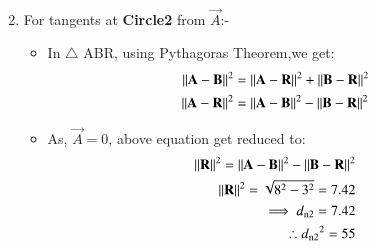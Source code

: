 \documentclass[journal,12pt,twocolumn]{IEEEtran}
\begin{document}
\begin{enumerate}
\begin{align}
\end{align}
\item For tangents at \textbf{Circle2} from $\vec{A}$:-
\begin{itemize}
\item In $\triangle$ ABR, using Pythagoras Theorem,we get:
\begin{align}
    \lVert\mathbf{A}-\mathbf{B}\rVert^2 &= \lVert\mathbf{A}-\mathbf{R}\rVert^2+ \lVert\mathbf{B}-\mathbf{R}\rVert^2
    \\
    \lVert\mathbf{A}-\mathbf{R}\rVert^2 &=\lVert\mathbf{A}-\mathbf{B}\rVert^2 - \lVert\mathbf{B}-\mathbf{R}\rVert^2
    \end{align}
    \item As, $\vec{A}=0$, above equation get reduced to:
    \begin{align}
    \lVert\mathbf{R}\rVert^2 = \lVert\mathbf{A}-\mathbf{B}\rVert^2 - \lVert\mathbf{B}-\mathbf{R}\rVert^2 
    \\
    \lVert\mathbf{R}\rVert^2=\sqrt{8^2 -3^2}=7.42
    \\
   \implies d\textsubscript{n2}=7.42
    \\
    \therefore d\textsubscript{n2}^2=55\label{eqc}
\end{align}
\end{itemize}



\end{enumerate}
\end{document}
